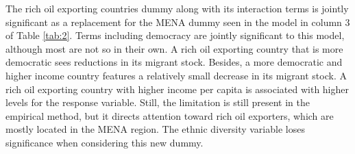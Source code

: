 \documentclass[../main.tex]{subfiles}
\begin{document}
The rich oil exporting countries dummy along with its interaction terms is jointly significant as a replacement for the MENA dummy seen in the model in column 3 of Table \ref{tab:2}.  Terms including democracy are jointly significant to this model, although most are not so in their own. A rich oil exporting country that is more democratic sees reductions in its migrant stock. Besides, a more democratic and higher income country features a relatively small decrease in its migrant stock. A rich oil exporting country with higher income per capita is associated with higher levels for the response variable. Still, the limitation is still present in the empirical method, but it directs attention toward rich oil exporters, which are mostly located in the MENA region.  The ethnic diversity variable loses significance when considering this new dummy. 
\begin{figure}[H]
\centering
{}
\end{figure}
\end{document}
